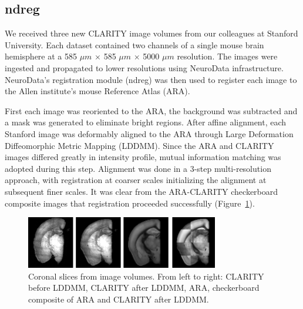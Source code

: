 \documentclass[simplex.tex]{subfiles}
\begin{document}
\subsection{ndreg}

We received three new CLARITY image volumes from our colleagues at Stanford University. 
Each dataset contained two channels of a single mouse brain hemisphere at a 585 $\mu m$ $\times$ 585 $\mu m$ $\times$ 5000 $\mu m$ resolution.
The images were ingested and propagated to lower resolutions using NeuroData infrastructure.
NeuroData's registration module (ndreg) was then used to register each image to the Allen institute's mouse Reference Atlas (ARA).

First each image was reoriented to the ARA, the background was subtracted and a mask was generated to eliminate bright regions.
After affine alignment, each Stanford image was deformably aligned to the ARA through Large Deformation Diffeomorphic Metric Mapping (LDDMM).
Since the ARA and CLARITY images differed greatly in intensity profile, mutual information matching was adopted during this step.
Alignment was done in a 3-step multi-resolution approach, with registration at coarser scales initializing the alignment at subsequent finer scales.
It was clear from the ARA-CLARITY checkerboard composite images that registration proceeded successfully (Figure~\ref{fig:ndregAiley}).

\begin{figure}[h!]
\begin{cframed}
\centering
\includegraphics[width=0.75\textwidth]{../../figs/ndreg-ailey.png}
\caption{
  Coronal slices from image volumes.
  From left to right: CLARITY before LDDMM, CLARITY after LDDMM, ARA, checkerboard composite of ARA and CLARITY after LDDMM.
}
\label{fig:ndregAiley}
\end{cframed}
\end{figure}

\clearpage
\end{document}
